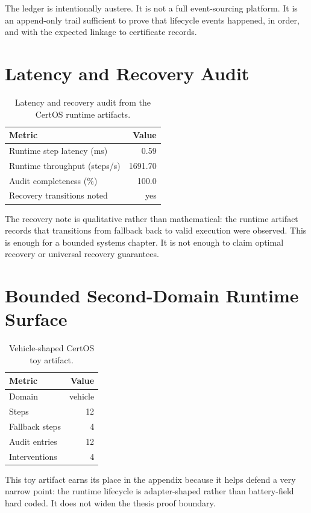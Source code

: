 The ledger is intentionally austere.  It is not a full event-sourcing
platform.  It is an append-only trail sufficient to prove that lifecycle
events happened, in order, and with the expected linkage to certificate
records.

\section{Latency and Recovery Audit}

\begin{table}[ht]
\centering
\caption{Latency and recovery audit from the CertOS runtime artifacts.}
\label{tab:certos-latency-recovery}
\begin{tabular}{p{5.8cm}r}
\toprule
\textbf{Metric} & \textbf{Value} \\
\midrule
Runtime step latency (ms) & 0.59 \\
Runtime throughput (steps/s) & 1691.70 \\
Audit completeness (\%) & 100.0 \\
Recovery transitions noted & yes \\
\bottomrule
\end{tabular}
\end{table}

The recovery note is qualitative rather than mathematical: the runtime
artifact records that transitions from fallback back to valid execution were
observed.  This is enough for a bounded systems chapter.  It is not enough
to claim optimal recovery or universal recovery guarantees.

\section{Bounded Second-Domain Runtime Surface}

\begin{table}[ht]
\centering
\caption{Vehicle-shaped CertOS toy artifact.}
\label{tab:certos-toy-domain}
\begin{tabular}{lr}
\toprule
\textbf{Metric} & \textbf{Value} \\
\midrule
Domain & vehicle \\
Steps & 12 \\
Fallback steps & 4 \\
Audit entries & 12 \\
Interventions & 4 \\
\bottomrule
\end{tabular}
\end{table}

This toy artifact earns its place in the appendix because it helps defend a
very narrow point: the runtime lifecycle is adapter-shaped rather than
battery-field hard coded.  It does not widen the thesis proof boundary.
